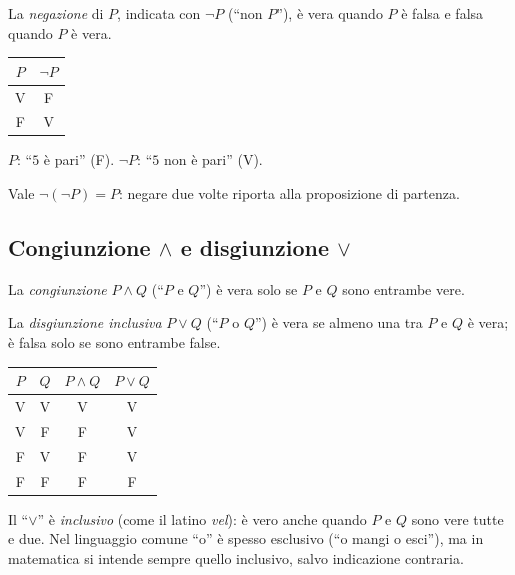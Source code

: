 \documentclass[11pt,a4paper]{article}
\newcommand{\V}{\textsf{V}}
\newcommand{\F}{\textsf{F}}
\begin{document}
\begin{definizione}
La \emph{negazione} di $P$, indicata con $\neg P$ (``non $P$''), è vera
quando $P$ è falsa e falsa quando $P$ è vera.
\end{definizione}

\begin{center}
\begin{tabular}{c|c}
$P$ & $\neg P$ \\ \hline
\V & \F \\
\F & \V
\end{tabular}
\end{center}

\begin{esempio}
$P$: ``$5$ è pari'' (\F). \quad $\neg P$: ``$5$ non è pari'' (\V).
\end{esempio}

Vale $\neg(\neg P) = P$: negare due volte riporta alla proposizione di
partenza.

\subsection{Congiunzione $\land$ e disgiunzione $\lor$}

\begin{definizione}
La \emph{congiunzione} $P \land Q$ (``$P$ e $Q$'') è vera solo se $P$ e $Q$
sono entrambe vere.

La \emph{disgiunzione inclusiva} $P \lor Q$ (``$P$ o $Q$'') è vera se
almeno una tra $P$ e $Q$ è vera; è falsa solo se sono entrambe false.
\end{definizione}

\begin{center}
\begin{tabular}{cc|c|c}
$P$ & $Q$ & $P \land Q$ & $P \lor Q$ \\ \hline
\V & \V & \V & \V \\
\V & \F & \F & \V \\
\F & \V & \F & \V \\
\F & \F & \F & \F
\end{tabular}
\end{center}

\begin{osservazione}
Il ``$\lor$'' è \emph{inclusivo} (come il latino \emph{vel}): è vero anche
quando $P$ e $Q$ sono vere tutte e due. Nel linguaggio comune ``o'' è spesso
esclusivo (``o mangi o esci''), ma in matematica si intende sempre quello
inclusivo, salvo indicazione contraria.
\end{osservazione}
\end{document}
